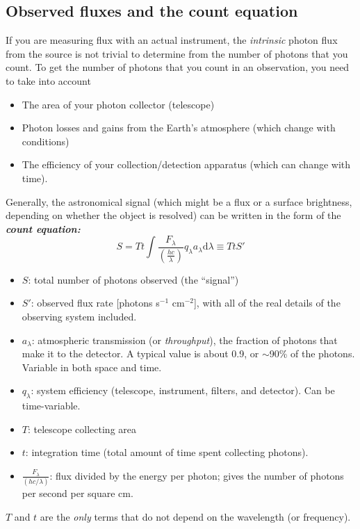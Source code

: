 \documentclass[12pt]{article}
\begin{document}
\subsection{Observed fluxes and the count equation}
If you are measuring flux with an actual instrument,
the \emph{intrinsic} photon flux from the source is not
trivial to determine from the number of photons that you count.
To get the number of photons that you count in an observation,
you need to take into account
\begin{itemize}
    \item The area of your photon collector (telescope)
    \item Photon losses and gains from the Earth's atmosphere
    (which change with conditions)
    \item The efficiency of your collection/detection
    apparatus (which can change with time).
\end{itemize}
Generally, the astronomical signal (which might be a flux or a
surface brightness, depending on whether the object is resolved)
can be written in the form of the \emph{\textbf{count equation:}}
    $$ S = Tt \int \frac{F_{\lambda}}
    {\left(\frac{hc}{\lambda}\right)}q_{\lambda}
    a_{\lambda}\textrm{d}\lambda \equiv TtS' $$
    \begin{itemize}
        \item $S$: total number of photons observed (the ``signal'')
        \item $S'$: observed flux rate [photons s$^{-1}$ cm$^{-2}$],
            with all of the real details of the observing system included.
        \item $a_{\lambda}$: atmospheric transmission
            (or \emph{throughput}), the fraction of photons that
            make it to the detector.
            A typical value is about 0.9, or $\sim$90\% of the photons.
            Variable in both space and time.
        \item $q_{\lambda}$: system efficiency
            (telescope, instrument, filters, and detector). Can be
            time-variable.
        \item $T$: telescope collecting area
        \item $t$: integration time
            (total amount of time spent collecting photons).
        \item $\frac{F_{\lambda}}{\left(hc/\lambda\right)}$:
            flux divided by the energy per photon;
            gives the number of photons per second per square cm.
    \end{itemize}
$T$ and $t$ are the \emph{only} terms that do not depend on
the wavelength (or frequency).
\end{document}
